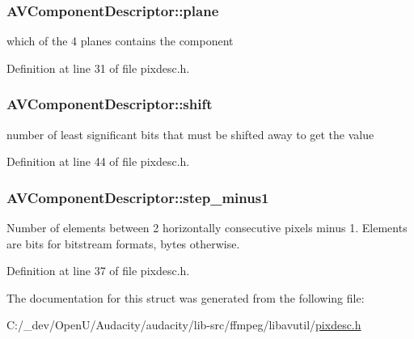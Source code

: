 \subsubsection[{\texorpdfstring{plane}{plane}}]{ A\+V\+Component\+Descriptor\+::plane}\hypertarget{struct_a_v_component_descriptor_af04062021a495e4e7281daf56d0dc5f2}{}\label{struct_a_v_component_descriptor_af04062021a495e4e7281daf56d0dc5f2}


which of the 4 planes contains the component 



Definition at line 31 of file pixdesc.\+h.

\subsubsection[{\texorpdfstring{shift}{shift}}]{ A\+V\+Component\+Descriptor\+::shift}\hypertarget{struct_a_v_component_descriptor_ad487b67c4c15c59f2963f1454e41861c}{}\label{struct_a_v_component_descriptor_ad487b67c4c15c59f2963f1454e41861c}


number of least significant bits that must be shifted away to get the value 



Definition at line 44 of file pixdesc.\+h.

\subsubsection[{\texorpdfstring{step\+\_\+minus1}{step_minus1}}]{ A\+V\+Component\+Descriptor\+::step\+\_\+minus1}\hypertarget{struct_a_v_component_descriptor_ac1e0fdc2d6f0e4968ab2dbfde2e931fd}{}\label{struct_a_v_component_descriptor_ac1e0fdc2d6f0e4968ab2dbfde2e931fd}
Number of elements between 2 horizontally consecutive pixels minus 1. Elements are bits for bitstream formats, bytes otherwise. 

Definition at line 37 of file pixdesc.\+h.



The documentation for this struct was generated from the following file\+:\begin{DoxyCompactItemize}
\item 
C\+:/\+\_\+dev/\+Open\+U/\+Audacity/audacity/lib-\/src/ffmpeg/libavutil/\hyperlink{pixdesc_8h}{pixdesc.\+h}\end{DoxyCompactItemize}
